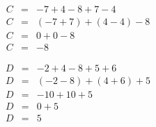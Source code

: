 \begin{myexs}
	\begin{multicols}{2}
		
	\begin{eqnarray*}
		C &=& - 7 + 4 - 8 + 7 - 4 \\
		C &=& (- 7 + 7) + (4 - 4) - 8  \\
		C &=& 0 + 0 - 8 \\
		C &=& -8
	\end{eqnarray*}


	\begin{eqnarray*}
		D &=& -2 + 4 - 8 + 5 + 6 \\
		D &=& (- 2 - 8) + (4 + 6) + 5 \\
		D &=& -10 + 10 + 5 \\
		D &=& 0 + 5 \\
		D &=& 5
	\end{eqnarray*}
	\end{multicols}
\end{myexs}